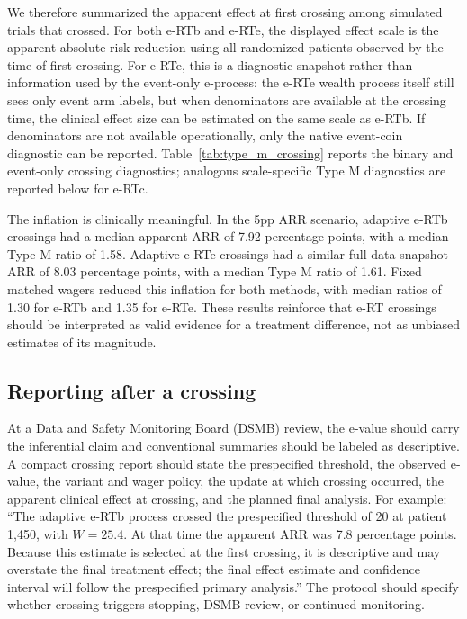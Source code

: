\documentclass[10pt]{article}
\begin{document}
We therefore summarized the apparent effect at first crossing among simulated trials that crossed. For both e-RTb and e-RTe, the displayed effect scale is the apparent absolute risk reduction using all randomized patients observed by the time of first crossing. For e-RTe, this is a diagnostic snapshot rather than information used by the event-only e-process: the e-RTe wealth process itself still sees only event arm labels, but when denominators are available at the crossing time, the clinical effect size can be estimated on the same scale as e-RTb. If denominators are not available operationally, only the native event-coin diagnostic can be reported. Table~\ref{tab:type_m_crossing} reports the binary and event-only crossing diagnostics; analogous scale-specific Type M diagnostics are reported below for e-RTc.



The inflation is clinically meaningful. In the 5pp ARR scenario, adaptive e-RTb crossings had a median apparent ARR of 7.92 percentage points, with a median Type M ratio of 1.58. Adaptive e-RTe crossings had a similar full-data snapshot ARR of 8.03 percentage points, with a median Type M ratio of 1.61. Fixed matched wagers reduced this inflation for both methods, with median ratios of 1.30 for e-RTb and 1.35 for e-RTe. These results reinforce that e-RT crossings should be interpreted as valid evidence for a treatment difference, not as unbiased estimates of its magnitude.

\subsection{Reporting after a crossing}

At a Data and Safety Monitoring Board (DSMB) review, the e-value should carry the inferential claim and conventional summaries should be labeled as descriptive. A compact crossing report should state the prespecified threshold, the observed e-value, the variant and wager policy, the update at which crossing occurred, the apparent clinical effect at crossing, and the planned final analysis. For example: ``The adaptive e-RTb process crossed the prespecified threshold of 20 at patient 1{,}450, with $W=25.4$. At that time the apparent ARR was 7.8 percentage points. Because this estimate is selected at the first crossing, it is descriptive and may overstate the final treatment effect; the final effect estimate and confidence interval will follow the prespecified primary analysis.'' The protocol should specify whether crossing triggers stopping, DSMB review, or continued monitoring.
\end{document}
